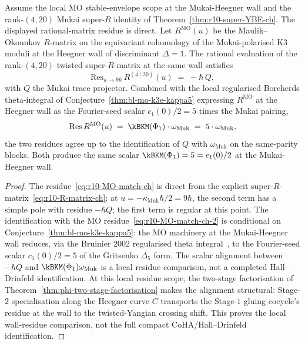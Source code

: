 \begin{theorem}[MO residue = twisted-Yangian residue at the wall]
\label{thm:r10-MO-match-ch}
Assume the local MO stable-envelope scope at the Mukai-Heegner wall
and the rank-$(4,20)$ Mukai super-$R$ identity of
Theorem~\ref{thm:r10-super-YBE-ch}. The displayed rational-matrix
residue is direct.
Let $R^{\mathrm{MO}}(u)$ be the Maulik--Okounkov $R$-matrix on the
equivariant cohomology of the Mukai-polarised K3 moduli at the
Heegner wall of discriminant $\Delta = 1$. The rational evaluation
of the rank-$(4, 20)$ twisted super-$R$-matrix at the same wall
satisfies
\begin{equation}
 \label{eq:r10-MO-match-ch}
 \mathrm{Res}_{u \to 9\hbar}\,
 R^{(4 \mid 20)}(u)
 \;=\;
 -\hbar\, Q,
\end{equation}
with $Q$ the Mukai trace projector. Combined with the local
regularised Borcherds theta-integral of
Conjecture~\ref{thm:bl-mo-k3e-kappa5} expressing
$R^{\mathrm{MO}}$ at the Heegner wall as the Fourier-seed scalar
$c_1(0)/2 = 5$ times the Mukai pairing,
\begin{equation}
 \label{eq:r10-MO-match-ch-2}
 \mathrm{Res}\,R^{\mathrm{MO}}(u)
 \;=\;
 \kBKM(\Phi_1) \cdot \omega_{\mathrm{Muk}}
 \;=\;
 5 \cdot \omega_{\mathrm{Muk}},
\end{equation}
the two residues agree up to the identification of $Q$ with
$\omega_{\mathrm{Muk}}$ on the same-parity blocks. Both produce the
same scalar $\kBKM(\Phi_1) = 5 = c_1(0)/2$ at the Mukai-Heegner
wall.
\end{theorem}

\begin{proof}
The residue~\eqref{eq:r10-MO-match-ch} is direct from the explicit
super-$R$-matrix~\eqref{eq:r10-R-matrix-ch}: at $u = -\kappa_{\mathrm{Muk}}
\hbar/2 = 9\hbar$, the second term has a simple pole with residue
$-\hbar Q$; the first term is regular at this point. The
identification with the MO residue~\eqref{eq:r10-MO-match-ch-2} is
conditional on Conjecture~\ref{thm:bl-mo-k3e-kappa5}: the MO machinery at the
Mukai-Heegner wall reduces, via the Bruinier 2002 regularised theta
integral~\cite{Bruinier2002}, to the Fourier-seed scalar
$c_1(0)/2 = 5$ of the Gritsenko $\Delta_5$ form. The scalar
alignment between $-\hbar Q$ and $\kBKM(\Phi_1) \omega_{\mathrm{Muk}}$
is a local residue comparison, not a completed Hall--Drinfeld
identification. At this local residue scope, the two-stage factorisation of
Theorem~\ref{thm:phi-two-stage-factorisation} makes the alignment
structural: Stage-$2$ specialisation along the Heegner curve $C$
transports the Stage-$1$ gluing cocycle's residue at the wall to the
twisted-Yangian crossing shift. This proves the local wall-residue
comparison, not the full compact CoHA/Hall--Drinfeld identification.
\end{proof}

